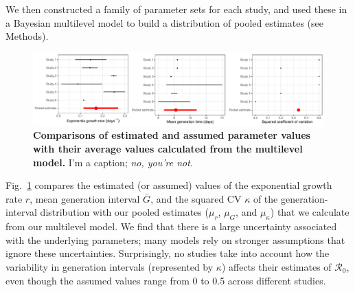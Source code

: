 \documentclass[12pt]{article}
\newcommand{\fref}[1]{Fig.~\ref{fig:#1}}
\begin{document}
We then constructed a family of parameter sets for each study, and used these in a Bayesian multilevel model to build a distribution of pooled estimates (see Methods).

\begin{figure}[!ht]
\includegraphics[width=\textwidth]{compare_assumption.pdf}
\caption{
\textbf{Comparisons of estimated and assumed parameter values with their average values calculated from the multilevel model.}
I'm a caption; \emph{no, you're not.}
}
\label{fig:assumption}
\end{figure}

\fref{assumption} compares the estimated (or assumed) values of the exponential growth rate $r$, mean generation interval $\bar G$, and the squared CV $\kappa$ of the generation-interval distribution with our pooled estimates ($\mu_r$, $\mu_G$, and $\mu_\kappa$) that we calculate from our multilevel model.
We find that there is a large uncertainty associated with the underlying parameters;
many models rely on stronger assumptions that ignore these uncertainties.
Surprisingly, no studies take into account how the variability in generation intervals (represented by $\kappa$) affects their estimates of $\mathcal R_0$, even though the assumed values range from 0 to 0.5 across different studies.
\end{document}
